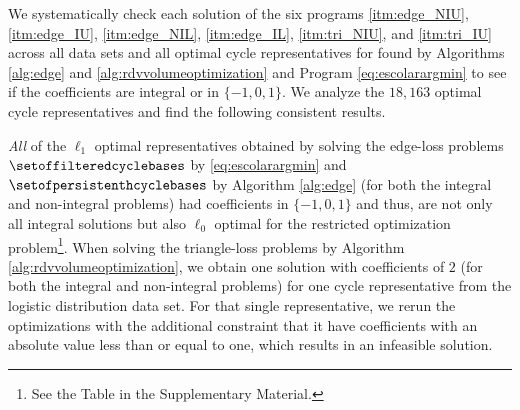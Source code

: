 We systematically check each solution of the six programs
\ref{itm:edge_NIU},
\ref{itm:edge_IU},
\ref{itm:edge_NIL},
\ref{itm:edge_IL},
\ref{itm:tri_NIU}, and
\ref{itm:tri_IU}
 across all data sets and all optimal cycle representatives for found by Algorithms \ref{alg:edge} and \ref{alg:rdvvolumeoptimization} and Program \eqref{eq:escolarargmin} to see if the coefficients are integral or in $\{-1,0,1\}$. We analyze the $18,163$ optimal cycle representatives and find the following consistent results.
 
 
 \emph{All} of the $\ell_1$ optimal representatives obtained by solving the edge-loss problems $\setoffilteredcyclebases$ by \pr \eqref{eq:escolarargmin} and $\setofpersistenthcyclebases$ by Algorithm \ref{alg:edge} (for both the integral and non-integral problems) had coefficients in $\{-1, 0, 1\}$ and thus, are not only all integral solutions but also $\ell_0$ optimal for the restricted optimization problem\footnote{See the Table in the Supplementary Material.}. When solving the triangle-loss problems by Algorithm \ref{alg:rdvvolumeoptimization}, we obtain one solution with coefficients of $2$ (for both the integral and non-integral problems) for one cycle representative from the logistic distribution data set. For that single representative, we rerun the optimizations with the additional constraint that it have coefficients with an absolute value less than or equal to one, which results in an infeasible solution. %



